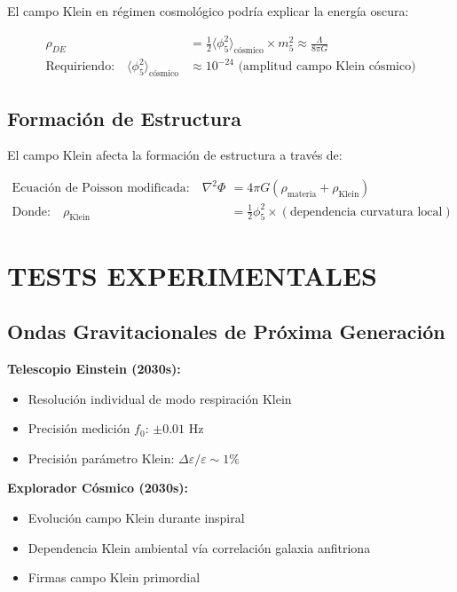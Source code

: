 \documentclass[12pt,a4paper]{article}
\begin{document}
El campo Klein en régimen cosmológico podría explicar la energía oscura:

\begin{align}
\rho_{DE} &= \frac{1}{2}\langle\phi_5^2\rangle_{\text{cósmico}} \times m_5^2 \approx \frac{\Lambda}{8\pi G}\\
\text{Requiriendo:} \quad \langle\phi_5^2\rangle_{\text{cósmico}} &\approx 10^{-24} \text{ (amplitud campo Klein cósmico)}
\end{align}

\subsection{Formación de Estructura}

El campo Klein afecta la formación de estructura a través de:

\begin{align}
\text{Ecuación de Poisson modificada:} \quad \nabla^2\Phi &= 4\pi G(\rho_{\text{materia}} + \rho_{\text{Klein}})\\
\text{Donde:} \quad \rho_{\text{Klein}} &= \frac{1}{2}\phi_5^2 \times (\text{dependencia curvatura local})
\end{align}

\section{TESTS EXPERIMENTALES}

\subsection{Ondas Gravitacionales de Próxima Generación}

\textbf{Telescopio Einstein (2030s):}
\begin{itemize}
\item Resolución individual de modo respiración Klein
\item Precisión medición $f_0$: $\pm 0.01$ Hz
\item Precisión parámetro Klein: $\Delta\varepsilon/\varepsilon \sim 1\%$
\end{itemize}

\textbf{Explorador Cósmico (2030s):}
\begin{itemize}
\item Evolución campo Klein durante inspiral
\item Dependencia Klein ambiental vía correlación galaxia anfitriona
\item Firmas campo Klein primordial
\end{itemize}
\end{document}
